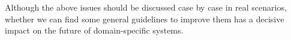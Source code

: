 \documentclass[11pt]{article}
\begin{document}
Although the above issues should be discussed case by case in real scenarios, whether we can find some general guidelines to improve them has a decisive impact on the future of domain-specific systems.




\end{document}
